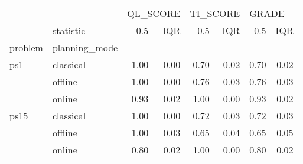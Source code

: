 \begin{tabular}{llrrrrrr}
\toprule
     & {} & \multicolumn{2}{l}{QL\_SCORE} & \multicolumn{2}{l}{TI\_SCORE} & \multicolumn{2}{l}{GRADE} \\
     & statistic &      0.5 &  IQR &      0.5 &  IQR &   0.5 &  IQR \\
problem & planning\_mode &          &      &          &      &       &      \\
\midrule
ps1 & classical &     1.00 & 0.00 &     0.70 & 0.02 &  0.70 & 0.02 \\
     & offline &     1.00 & 0.00 &     0.76 & 0.03 &  0.76 & 0.03 \\
     & online &     0.93 & 0.02 &     1.00 & 0.00 &  0.93 & 0.02 \\
ps15 & classical &     1.00 & 0.00 &     0.72 & 0.03 &  0.72 & 0.03 \\
     & offline &     1.00 & 0.03 &     0.65 & 0.04 &  0.65 & 0.05 \\
     & online &     0.80 & 0.02 &     1.00 & 0.00 &  0.80 & 0.02 \\
\bottomrule
\end{tabular}
